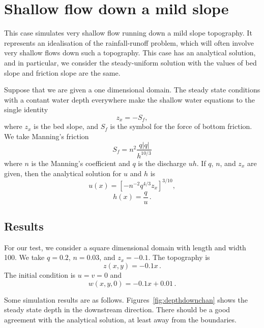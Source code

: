 

\section{Shallow flow down a mild slope}
This case simulates very shallow flow running down a mild slope topography. It represents an idealisation of the rainfall-runoff problem, which will often involve very shallow flows down such a topography. This case has an analytical solution, and in particular, we consider the steady-uniform solution with the values of bed slope and friction slope are the same.   

Suppose that we are given a one dimensional domain. The steady state conditions with a contant water depth everywhere make the shallow water equations to the single identity
\begin{equation}
z_x = - S_f, 
\end{equation}
where $z_x$ is the bed slope, and $S_f$ is the symbol for the force of bottom friction.  We take Manning's friction
\begin{equation}
S_f = n^2 \frac{q|q|}{h^{10/3}}
\end{equation}
where $n$ is the Manning's coefficient and $q$ is the discharge $uh$. 
If $q$, $n$, and $z_x$ are given, then the analytical solution for $u$ and $h$ is
\begin{equation}
u(x)= \left[- n^{-2} q^{4/3} z_x\right]^{3/10},
\end{equation}
\begin{equation}
h(x)= \frac{q}{u}\,.
\end{equation}

\subsection{Results}
For our test, we consider a square dimensional domain with length and width 100. We take $q=0.2$, $n=0.03$, and $z_x=-0.1$.
The topography is
\begin{equation}
z(x, y)= -0.1 x\,.
\end{equation}
The initial condition is $u=v=0$ and
\begin{equation}
w(x,y,0)= -0.1 x + 0.01\,.
\end{equation}


Some simulation results are as follows.
Figures~\ref{fig:depthdownchan} shows the steady state depth in the downstream direction. 
There should be a good agreement with the analytical solution, at least away from the boundaries. 

